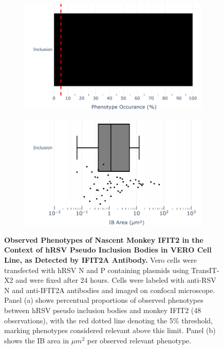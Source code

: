 \begin{figure}
    \begin{subfigure}{0.495\textwidth}
        \caption{}
        \includegraphics[width=1\linewidth]{09. Chapter 4/Figs/02. pIB/02. IFIT2A/04. bar_i2a_vero_hnhp.pdf} 
    \end{subfigure}
    \begin{subfigure}{0.495\textwidth}
        \caption{}
        \includegraphics[width=1\linewidth]{09. Chapter 4/Figs/02. pIB/02. IFIT2A/05. box_i2a_vero_hnhp.pdf}
    \end{subfigure}
    \caption[Observed Phenotypes of Nascent Monkey IFIT2 in the Context of hRSV Pseudo Inclusion Bodies in VERO Cell Line, as Detected by IFIT2A Antibody.]{\textbf{Observed Phenotypes of Nascent Monkey IFIT2 in the Context of hRSV Pseudo Inclusion Bodies in VERO Cell Line, as Detected by IFIT2A Antibody.} Vero cells were transfected with hRSV N and P containing plasmids using TransIT-X2 and were fixed after 24 hours. Cells were labeled with anti-RSV N and anti-IFIT2A antibodies and imaged on confocal microscope. Panel (a) shows percentual proportions of observed phenotypes between hRSV pseudo inclusion bodies and monkey IFIT2 (48 observations), with the red dotted line denoting the 5\% threshold, marking phenotypes considered relevant above this limit. Panel (b) shows the IB area in \(\mu m^2\) per observed relevant phenotype.}
    \label{fig:Observed Phenotypes of Nascent Monkey IFIT2 in the Context of hRSV Pseudo Inclusion Bodies in VERO Cell Line, as Detected by IFIT2A Antibody}
\end{figure}

